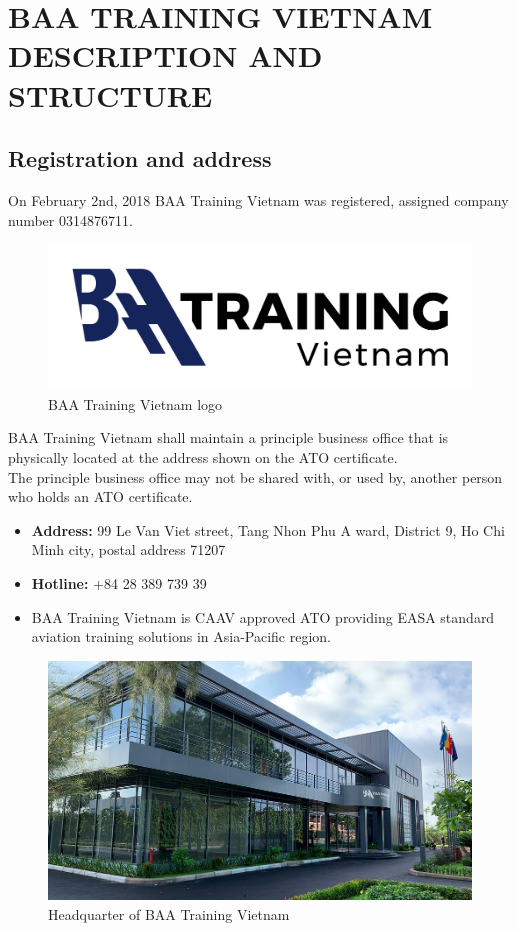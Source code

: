 \chapter{BAA TRAINING VIETNAM DESCRIPTION AND STRUCTURE}

\renewcommand{\headrulewidth}{0.5pt}
\renewcommand{\footrulewidth}{0.5pt}
\thispagestyle{plain}
\pagestyle{fancy}
\fancyhf{}
\raggedright
{}

\section{Registration and address}
    On February 2nd, 2018 BAA Training Vietnam was registered, assigned company number 0314876711. \\
    \begin{figure}[H]
        \centering
        \includegraphics[width=0.6\linewidth]{img/company-logo.png}
        \caption{BAA Training Vietnam logo}
    \end{figure}
    BAA Training Vietnam shall maintain a principle business office that is physically located at the address shown on the ATO certificate. \\ 
    \vspace{3mm}
    The principle business office may not be shared with, or used by, another person who holds an ATO certificate.
    \begin{itemize}
        \item \textbf{Address:} 99 Le Van Viet street, Tang Nhon Phu A ward, District 9, Ho Chi Minh city, postal address 71207
        \item \textbf{Hotline:} +84 28 389 739 39
        \item BAA Training Vietnam is CAAV approved ATO providing EASA standard aviation training solutions in Asia-Pacific region.
    \end{itemize}
    \begin{figure}[H]
        \centering
        \includegraphics[width=0.6\linewidth]{img/company.jpg}
        \caption{Headquarter of BAA Training Vietnam}
    \end{figure}

